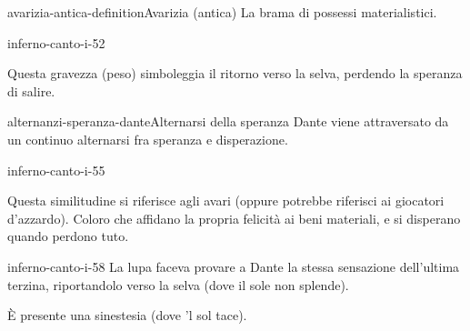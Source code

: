 \documentclass[preview]{standalone}
\begin{document}
\begin{snippetdefinition}{avarizia-antica-definition}{Avarizia (antica)}
    La brama di possessi materialistici.
\end{snippetdefinition}


\begin{snippet}{inferno-canto-i-52}

    Questa gravezza (peso) simboleggia il ritorno verso la selva, perdendo la speranza di salire.
\end{snippet}

\begin{snippetnote}{alternanzi-speranza-dante}{Alternarsi della speranza}
    Dante viene attraversato da un continuo alternarsi fra speranza e disperazione.
\end{snippetnote}

\begin{snippet}{inferno-canto-i-55}

    Questa similitudine si riferisce agli avari (oppure potrebbe riferisci ai giocatori d'azzardo).
    Coloro che affidano la propria felicità ai beni materiali, e si disperano quando perdono tuto.
\end{snippet}

\begin{snippet}{inferno-canto-i-58}
    La lupa faceva provare a Dante la stessa sensazione dell'ultima terzina,
    riportandolo verso la selva (dove il sole non splende).
    
    È presente una sinestesia (dove 'l sol tace).
\end{snippet}
\end{document}
